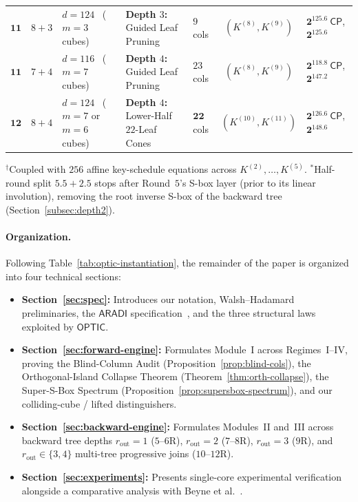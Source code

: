\documentclass[11pt,a4paper]{article}
\theoremstyle{definition}
\theoremstyle{remark}
\newcommand{\ARADI}{\mathsf{ARADI}}
\newcommand{\OPTIC}{\mathsf{OPTIC}}
\newcommand{\CP}{\mathsf{CP}}
\begin{document}
\begin{table}[t!]
{\begin{tabular}{@{}cclllcl@{}}
$\mathbf{11}$ & $8 + 3$ & $d{=}124$~\cite{BRRT25} ($m{=}3$ cubes) & \textbf{Depth $3$:} Guided Leaf Pruning & $9$ cols & $(K^{(8)},K^{(9)})$ & $\mathbf{2^{125.6}~\CP}$, $\mathbf{2^{125.6}}$ \\
$\mathbf{11}$ & $7 + 4$ & $d{=}116$~\cite{DG25} ($m{=}7$ cubes) & \textbf{Depth $4$:} Guided Leaf Pruning & $23$ cols & $(K^{(8)},K^{(9)})$ & $\mathbf{2^{118.8}~\CP}$, $\mathbf{2^{147.2}}$ \\
$\mathbf{12}$ & $8 + 4$ & $d{=}124$~\cite{BRRT25} ($m{=}7$ or $m{=}6$ cubes) & \textbf{Depth $4$:} Lower-Half $22$-Leaf Cones & $\mathbf{22}$ cols & $(K^{(10)},K^{(11)})$ & $\mathbf{2^{126.6}~\CP}$, $\mathbf{2^{148.6}}$ \\
\bottomrule
\end{tabular}%
}
\par\vspace{2pt}
{\raggedright\scriptsize $^\dagger$Coupled with $256$ affine key-schedule equations across $K^{(2)},\dots,K^{(5)}$. $^*$Half-round split $5.5 + 2.5$ stops after Round~$5$'s S-box layer (prior to its linear involution), removing the root inverse S-box of the backward tree (Section~\ref{subsec:depth2}).\par}
\end{table}

\paragraph{Organization.}
Following Table~\ref{tab:optic-instantiation}, the remainder of the paper is organized into four technical sections:
\begin{itemize}[leftmargin=1.8em,nosep]
    \item \textbf{Section~\ref{sec:spec}:} Introduces our notation, Walsh--Hadamard preliminaries, the $\ARADI$ specification~\cite{GMW24}, and the three structural laws exploited by $\OPTIC$.
    \item \textbf{Section~\ref{sec:forward-engine}:} Formulates Module~I across Regimes~I--IV, proving the Blind-Column Audit (Proposition~\ref{prop:blind-cols}), the Orthogonal-Island Collapse Theorem (Theorem~\ref{thm:orth-collapse}), the Super-S-Box Spectrum (Proposition~\ref{prop:supersbox-spectrum}), and our colliding-cube / lifted distinguishers.
    \item \textbf{Section~\ref{sec:backward-engine}:} Formulates Modules~II and~III across backward tree depths $r_{\text{out}} = 1$ ($5$--$6$R), $r_{\text{out}} = 2$ ($7$--$8$R), $r_{\text{out}} = 3$ ($9$R), and $r_{\text{out}} \in \{3, 4\}$ multi-tree progressive joins ($10$--$12$R).
    \item \textbf{Section~\ref{sec:experiments}:} Presents single-core experimental verification alongside a comparative analysis with Beyne et al.~\cite{BNS26}.
\end{itemize}
\end{document}
